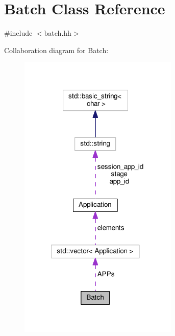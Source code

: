 \hypertarget{classBatch}{\section{Batch Class Reference}
\label{classBatch}
}


{\ttfamily \#include $<$batch.\-hh$>$}



Collaboration diagram for Batch\-:\nopagebreak
\begin{figure}[H]
\begin{center}
\leavevmode
\includegraphics[width=215pt]{classBatch__coll__graph}
\end{center}
\end{figure}
